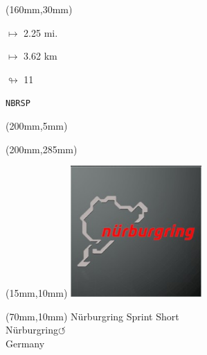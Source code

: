 \begin{textblock*}{40mm}(160mm,30mm)%
\Large
\par$\mapsto$ 2.25 mi.
\par$\mapsto$ 3.62 km
\par$\looparrowright$ 11
\par\hfill\tiny\tt NBRSP\\
\end{textblock*}
\begin{textblock*}{20mm}(200mm,5mm)%
\fbox{\thepage}
\label{NBRSP}
\end{textblock*}
\begin{textblock*}{20mm}(200mm,285mm)%
\fbox{\thepage}
\end{textblock*}

\null\newpage
\begin{textblock*}{50mm}(15mm,10mm)%
\includegraphics[width=50mm]{LG/2015-05-20_00089.png}
\end{textblock*}
\begin{textblock*}{130mm}(70mm,10mm)%
{\fontsize{20}{20}\selectfont Nürburgring Sprint Short\\}
{\fontsize{16}{16}\selectfont Nürburgring\hfill \huge$\circlearrowleft$\\}
{\fontsize{12}{12}\selectfont Germany\\}
\end{textblock*}
